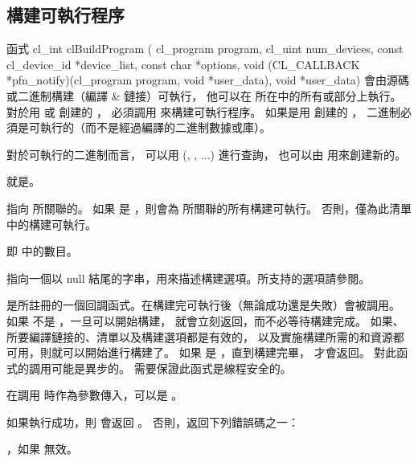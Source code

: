 \subsection{構建可執行程序}

函式
\startCLFUNC
cl_int clBuildProgram (
		cl_program program,
		cl_uint num_devices,
		const cl_device_id *device_list,
		const char *options,
		void (CL_CALLBACK *pfn_notify)(cl_program program,
					void *user_data),
		void *user_data)
\stopCLFUNC
會由源碼或二進制構建（編譯 & 鏈接）可執行，
他可以在  所在中的所有或部分上執行。
對於用  或  創建的 ，
必須調用  來構建可執行程序。
如果是用  創建的 ，
二進制必須是可執行的（而不是經過編譯的二進制數據或庫）。

對於可執行的二進制而言，
可以用 (, , ...) 進行查詢，
也可以由  用來創建新的。

 就是。

 指向  所關聯的。
如果  是 ，則會為  所關聯的所有構建可執行。
否則，僅為此清單中的構建可執行。

 即  中的數目。

 指向一個以 null 結尾的字串，用來描述構建選項。所支持的選項請參閱。

 是所註冊的一個回調函式。在構建完可執行後（無論成功還是失敗）會被調用。
如果  不是 ，一旦可以開始構建，  就會立刻返回，而不必等待構建完成。
如果、所要編譯鏈接的、清單以及構建選項都是有效的，
以及實施構建所需的和資源都可用，則就可以開始進行構建了。
如果  是 ，直到構建完畢，  才會返回。
對此函式的調用可能是異步的。
需要保證此函式是線程安全的。

 在調用  時作為參數傳入，可以是 。

如果執行成功，則  會返回 。
否則，返回下列錯誤碼之一：
\startigBase
\item {}，如果  無效。

